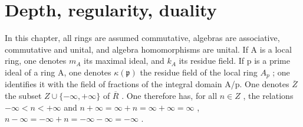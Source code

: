 \chapter{Depth, regularity, duality}

In this chapter, all rings are assumed commutative, algebras are associative, commutative and unital, and algebra homomorphisms are unital. If A is a local ring, one denotes \(m_{A}\) its maximal ideal, and \(k_{A}\) its residue field. If p is a prime ideal of a ring A, one denotes \(\kappa(\mathfrak{p})\) the residue field of the local ring \(A_{p}\) ; one identifies it with the field of fractions of the integral domain A/p. One denotes \(\overline{Z}\) the subset \(Z \cup \{-\infty, +\infty\}\) of \(\overline{R}\) . One therefore has, for all \(n \in Z\) , the relations \(-\infty < n < +\infty\) and \(n + \infty = \infty + n = \infty + \infty = \infty\) , \(n - \infty = -\infty + n = -\infty - \infty = -\infty\) .

